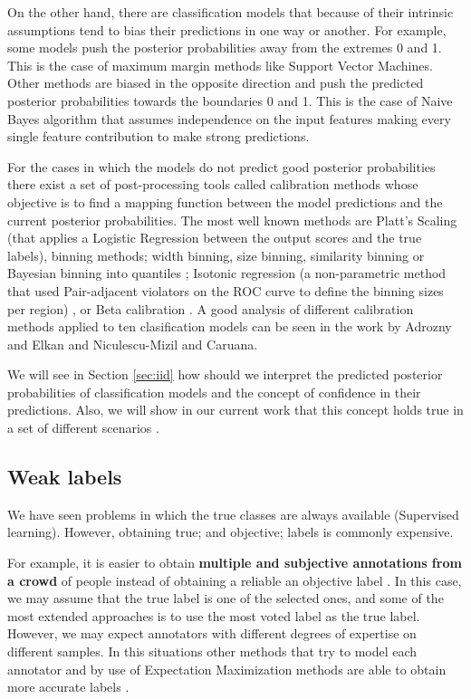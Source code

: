 \documentclass[a4paper, 12pt]{article}
\begin{document}
On the other hand, there are classification models that because of their intrinsic assumptions tend to bias their predictions in one way or another.
For example, some models push the posterior probabilities away from the extremes 0 and 1.
This is the case of maximum margin methods like Support Vector Machines.
Other methods are biased in the opposite direction and push the predicted posterior probabilities towards the boundaries 0 and 1.
This is the case of Naive Bayes algorithm that assumes independence on the input features making every single feature contribution to make strong predictions.

For the cases in which the models do not predict good posterior probabilities there  exist a set of post-processing tools called calibration methods whose objective is to find a mapping function between the model predictions and the current posterior probabilities.
The most well known methods are Platt's Scaling \cite{Platt1999} (that applies a Logistic Regression between the output scores and the true labels), binning methods; width binning, size binning, similarity binning \cite{Bella2009} or Bayesian binning into quantiles \cite{Naeini2015}; Isotonic regression \cite{Zadrozny2001,Zadrozny2002} (a non-parametric method that used Pair-adjacent violators on the ROC curve to define the binning sizes per region) , or Beta calibration \cite{Kull2017,Kull2017b}.
A good analysis of different calibration methods applied to ten clasification models can be seen in the work by Adrozny and Elkan \cite{Zadrozny2002}  and Niculescu-Mizil and Caruana\cite{ Niculescu-Mizil2005}.

We will see in Section \ref{sec:iid} how should we interpret the predicted posterior probabilities of classification models and the concept of confidence in their predictions.
Also, we will show in our current work that this concept holds true in a set of different scenarios \cite{perello2016}.

\subsection{Weak labels}
\label{sec:weak:label}

We have seen problems in which the true classes are always available (Supervised learning).
However, obtaining true; and objective; labels is commonly expensive.

For example, it is easier to obtain \textbf{multiple and subjective annotations from a crowd} of people instead of obtaining a reliable an objective label \cite{Raykar2010}.
In this case, we may assume that the true label is one of the selected ones, and some of the most extended approaches is to use the most voted label as the true label.
However,  we may expect annotators with different degrees of expertise on different samples.
In this situations other methods that try to model each annotator and by use of Expectation Maximization methods are able to obtain more accurate labels \cite{Raykar2010}.  
\end{document}
